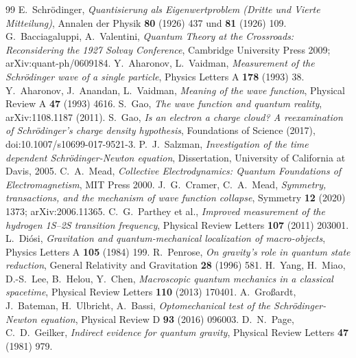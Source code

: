 \begingroup\renewcommand{\chapter}[2]{}\small
\begin{thebibliography}{99}
 E.~Schrödinger, \textit{Quantisierung als Eigenwertproblem (Dritte und Vierte Mitteilung)}, Annalen der Physik \textbf{80} (1926) 437 und \textbf{81} (1926) 109.
 G.~Bacciagaluppi, A.~Valentini, \textit{Quantum Theory at the Crossroads: Reconsidering the 1927 Solvay Conference}, Cambridge University Press 2009; arXiv:quant-ph/0609184.
 Y.~Aharonov, L.~Vaidman, \textit{Measurement of the Schrödinger wave of a single particle}, Physics Letters A \textbf{178} (1993) 38.
 Y.~Aharonov, J.~Anandan, L.~Vaidman, \textit{Meaning of the wave function}, Physical Review A \textbf{47} (1993) 4616.
 S.~Gao, \textit{The wave function and quantum reality}, arXiv:1108.1187 (2011).
 S.~Gao, \textit{Is an electron a charge cloud? A reexamination of Schrödinger's charge density hypothesis}, Foundations of Science (2017), doi:10.1007/s10699-017-9521-3.
 P.~J.~Salzman, \textit{Investigation of the time dependent Schrödinger-Newton equation}, Dissertation, University of California at Davis, 2005.
 C.~A.~Mead, \textit{Collective Electrodynamics: Quantum Foundations of Electromagnetism}, MIT Press 2000.
 J.~G.~Cramer, C.~A.~Mead, \textit{Symmetry, transactions, and the mechanism of wave function collapse}, Symmetry \textbf{12} (2020) 1373; arXiv:2006.11365.
 C.~G.~Parthey et al., \textit{Improved measurement of the hydrogen 1S--2S transition frequency}, Physical Review Letters \textbf{107} (2011) 203001.
 L.~Diósi, \textit{Gravitation and quantum-mechanical localization of macro-objects}, Physics Letters A \textbf{105} (1984) 199.
 R.~Penrose, \textit{On gravity's role in quantum state reduction}, General Relativity and Gravitation \textbf{28} (1996) 581.
 H.~Yang, H.~Miao, D.-S.~Lee, B.~Helou, Y.~Chen, \textit{Macroscopic quantum mechanics in a classical spacetime}, Physical Review Letters \textbf{110} (2013) 170401.
 A.~Großardt, J.~Bateman, H.~Ulbricht, A.~Bassi, \textit{Optomechanical test of the Schrödinger-Newton equation}, Physical Review D \textbf{93} (2016) 096003.
 D.~N.~Page, C.~D.~Geilker, \textit{Indirect evidence for quantum gravity}, Physical Review Letters \textbf{47} (1981) 979.
\end{thebibliography}
\endgroup
